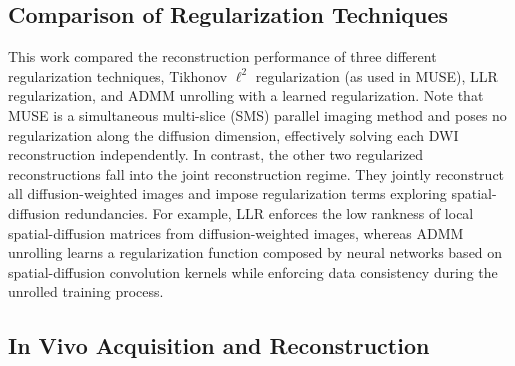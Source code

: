 \documentclass[AMA,STIX2COL,Linenumberson]{MRM}
\begin{document}
\subsection{Comparison of Regularization Techniques}

This work compared the reconstruction performance
of three different regularization techniques,
Tikhonov $\ell^2$ regularization (as used in MUSE),
LLR regularization,
and ADMM unrolling with a learned regularization.
Note that MUSE is a simultaneous multi-slice (SMS) parallel imaging method
and poses no regularization along the diffusion dimension,
effectively solving each DWI reconstruction independently.
In contrast, the other two regularized reconstructions
fall into the joint reconstruction regime.
They jointly reconstruct all diffusion-weighted images
and impose regularization terms exploring spatial-diffusion redundancies.
For example, LLR enforces the low rankness of
local spatial-diffusion matrices from diffusion-weighted images,
whereas ADMM unrolling learns a regularization function composed by neural networks
based on spatial-diffusion convolution kernels
while enforcing data consistency during the unrolled training process.

\subsection{In Vivo Acquisition and Reconstruction}
\end{document}
